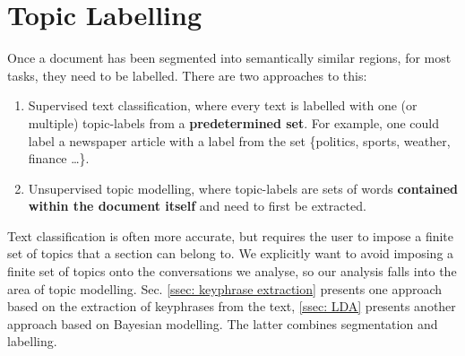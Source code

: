 \section{Topic Labelling \label{ssec: topic labelling}}

Once a document has been segmented into semantically similar regions, for most tasks, they need to be labelled. There are two approaches to this:

\begin{enumerate}
    \item Supervised text classification, where every text is labelled with one (or multiple) topic-labels from a \textbf{predetermined set}\cite{surverTextClassification}. For example, one could label a newspaper article with a label from the set \{politics, sports, weather, finance \dots\}.
    \item Unsupervised topic modelling, where topic-labels are sets of words \textbf{contained within the document itself} and need to first be extracted.
\end{enumerate}

Text classification is often more accurate, but requires the user to impose a finite set of topics that a section can belong to. We explicitly want to avoid imposing a finite set of topics onto the conversations we analyse, so our analysis falls into the area of topic modelling. Sec. \ref{ssec: keyphrase extraction} presents one approach based on the extraction of keyphrases from the text, \ref{ssec: LDA} presents another approach based on Bayesian modelling. The latter combines segmentation and labelling.